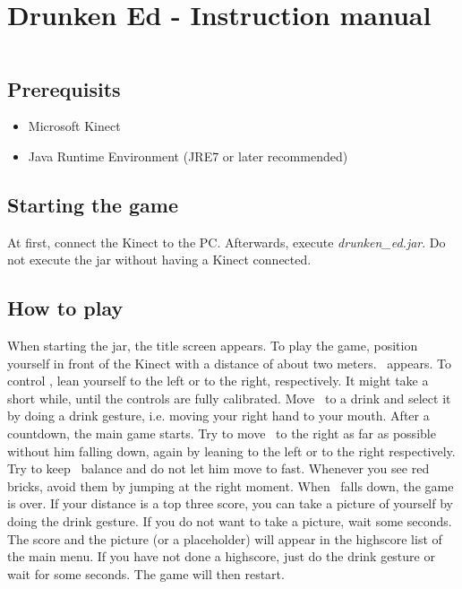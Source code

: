 \documentclass{article}
\begin{document}
\section*{Drunken Ed - Instruction manual}

$ $\\

\subsection*{Prerequisits}

\begin{itemize}
\item Microsoft Kinect
\item Java Runtime Environment (JRE7 or later recommended)
\end{itemize}

\subsection*{Starting the game}

At first, connect the Kinect to the PC. Afterwards, execute \textit{drunken\_ed.jar}. Do not execute the jar without having a Kinect connected.

\subsection*{How to play}

When starting the jar, the title screen appears.
To play the game, position yourself in front of the Kinect with a distance of about two meters. \ed\ appears. To control \ed, lean yourself to the left or to the right, respectively.
It might take a short while, until the controls are fully calibrated. Move \ed\ to a drink and select it by doing a drink gesture, i.e. moving your right hand to your mouth. After a countdown, the main game starts. Try to move \ed\ to the right as far as possible without him falling down, again by leaning to the left or to the right respectively. Try to keep \eds\ balance and do not let him move to fast.
Whenever you see red bricks, avoid them by jumping at the right moment.
When \ed\ falls down, the game is over. If your distance is a top three score, you can take a picture of yourself by doing the drink gesture.
If you do not want to take a picture, wait some seconds. The score and the picture (or a placeholder) will appear in the highscore list of the main menu. If you have not done a highscore, just do the drink gesture or wait for some seconds. The game will then restart.
\end{document}
